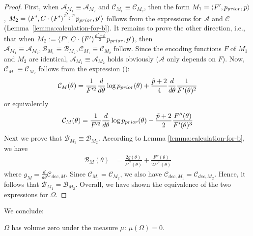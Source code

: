 \begin{proof}
First, when $\mathcal{A}_{M_1} \equiv \mathcal{A}_{M_2}$ and $\mathcal{C}_{M_1} \equiv \mathcal{C}_{M_2}$, then the form $M_1 = \langle F',p_{prior}, p\rangle $, $M_2 = \langle F',C \cdot (F')^{\frac{\tilde{p'}-\tilde{p}}{2}} p_{prior}, p'\rangle$ follows from the expressions for $\mathcal{A}$ and $\mathcal{C}$ (Lemma~\ref{lemma:calculation-for-b}).
    It remains to prove the other direction, i.e., that when $M_2 := \langle F',C \cdot (F')^{\frac{\tilde{p}'-\tilde{p}}{2}} p_{prior}, p')$, then
    $\mathcal{A}_{M_1} \equiv \mathcal{A}_{M_2}, \mathcal{B}_{M_1} \equiv \mathcal{B}_{M_2}, \mathcal{C}_{M_1} \equiv \mathcal{C}_{M_2}$ follow.
    Since the encoding functions $F$ of $M_1$ and $M_2$ are identical, $\mathcal{A}_{M_1} \equiv \mathcal{A}_{M_2}$ holds obviously ($\mathcal{A}$ only depends on $F$).
Now, $\mathcal{C}_{M_1} \equiv \mathcal{C}_{M_2}$ follows from the expression (\label{eq:c-coefficient}):
\begin{equation}
    \mathcal{C}_M(\theta) = \frac{1}{F'^2} \frac{d}{d\theta} \log p_{prior}(\theta) + \frac{\tilde{p}+2}{4} \frac{d}{d\theta} \frac{1}{F'(\theta)^2} 
        \end{equation}
or equivalently
    \begin{equation*}
        \mathcal{C}_M(\theta) = \frac{1}{F'^2} \frac{d}{d\theta} \log p_{prior}(\theta) - \frac{\tilde{p}+2}{2}\frac{F''(\theta)}{F'(\theta)^3}
    \end{equation*}
    Next we prove that $\mathcal{B}_{M_1} \equiv \mathcal{B}_{M_2}$. According to Lemma \ref{lemma:calculation-for-b}, we have 
    \begin{align*}
    \mathcal{B}_M(\theta) &= \frac{2g(\theta)}{F'^2(\theta)} + \frac{F''(\theta)}{2F'^6(\theta)}
    \end{align*}
    where $g_M = \frac{d}{d\theta} \mathcal{C}_{dec,M}$.
    Since $\mathcal{C}_{M_1} = \mathcal{C}_{M_2}$, we also have $\mathcal{C}_{dec,M_1} = \mathcal{C}_{dec,M_2}$.
    Hence, it follows that %
    $\mathcal{B}_{M_1} = \mathcal{B}_{M_2}$. 
Overall, we have shown the equivalence of the two expressions for $\Omega$.
\end{proof}

We conclude:
\begin{corollary}\label{lemma:statements-omega}\label{lemma:measure-zero}
        $\Omega$ has volume zero under the measure $\mu$: $\mu(\Omega) = 0$.  
\end{corollary}



